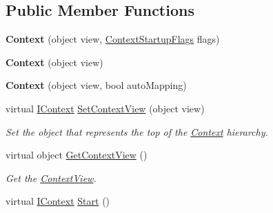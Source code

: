 \subsection*{Public Member Functions}
\begin{DoxyCompactItemize}
\item 
\hypertarget{classstrange_1_1extensions_1_1context_1_1impl_1_1_context_a5d98d5485ddc240722da2ecea332a091}{{\bfseries Context} (object view, \hyperlink{namespacestrange_1_1extensions_1_1context_1_1api_a6e67a548377c1491bddc3a81c0f312c5}{Context\-Startup\-Flags} flags)}\label{classstrange_1_1extensions_1_1context_1_1impl_1_1_context_a5d98d5485ddc240722da2ecea332a091}

\item 
\hypertarget{classstrange_1_1extensions_1_1context_1_1impl_1_1_context_a071da868ab830edfef1059c80efd2a43}{{\bfseries Context} (object view)}\label{classstrange_1_1extensions_1_1context_1_1impl_1_1_context_a071da868ab830edfef1059c80efd2a43}

\item 
\hypertarget{classstrange_1_1extensions_1_1context_1_1impl_1_1_context_a829b0522b65ec2d82659765582b65427}{{\bfseries Context} (object view, bool auto\-Mapping)}\label{classstrange_1_1extensions_1_1context_1_1impl_1_1_context_a829b0522b65ec2d82659765582b65427}

\item 
virtual \hyperlink{interfacestrange_1_1extensions_1_1context_1_1api_1_1_i_context}{I\-Context} \hyperlink{classstrange_1_1extensions_1_1context_1_1impl_1_1_context_a376f83ac4bf2233eedbc760f1aeddccd}{Set\-Context\-View} (object view)
\begin{DoxyCompactList}\small\item\em Set the object that represents the top of the \hyperlink{classstrange_1_1extensions_1_1context_1_1impl_1_1_context}{Context} hierarchy. \end{DoxyCompactList}\item 
\hypertarget{classstrange_1_1extensions_1_1context_1_1impl_1_1_context_a125ee92dbe4061fcc181e74215462699}{virtual object \hyperlink{classstrange_1_1extensions_1_1context_1_1impl_1_1_context_a125ee92dbe4061fcc181e74215462699}{Get\-Context\-View} ()}\label{classstrange_1_1extensions_1_1context_1_1impl_1_1_context_a125ee92dbe4061fcc181e74215462699}

\begin{DoxyCompactList}\small\item\em Get the \hyperlink{classstrange_1_1extensions_1_1context_1_1impl_1_1_context_view}{Context\-View}. \end{DoxyCompactList}\item 
\hypertarget{classstrange_1_1extensions_1_1context_1_1impl_1_1_context_a29da25935b72076b614409b2a3bf5ba0}{virtual \hyperlink{interfacestrange_1_1extensions_1_1context_1_1api_1_1_i_context}{I\-Context} \hyperlink{classstrange_1_1extensions_1_1context_1_1impl_1_1_context_a29da25935b72076b614409b2a3bf5ba0}{Start} ()}\label{classstrange_1_1extensions_1_1context_1_1impl_1_1_context_a29da25935b72076b614409b2a3bf5ba0}


\end{DoxyCompactItemize}
